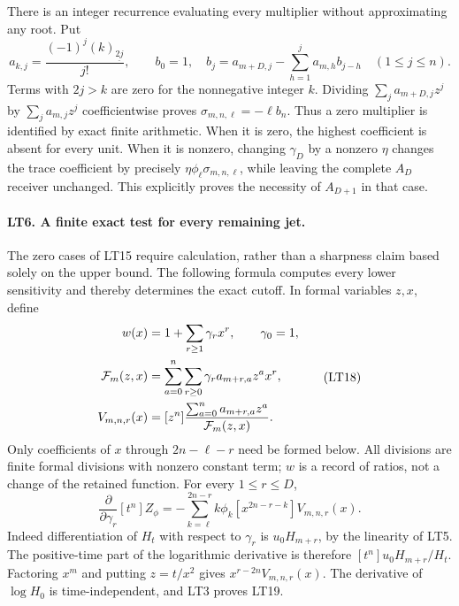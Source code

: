 There is an integer recurrence evaluating every multiplier without
approximating any root. Put
\[
 a_{k,j}=\frac{(-1)^j(k)_{\underline{2j}}}{j!},\qquad
 b_0=1,\quad
 b_j=a_{m+D,j}-\sum_{h=1}^j a_{m,h}b_{j-h}
       \quad(1\le j\le n).
 \tag{LT17}
\]
Terms with $2j>k$ are zero for the nonnegative integer $k$.
Dividing
$\sum_j a_{m+D,j}z^j$ by $\sum_j a_{m,j}z^j$ coefficientwise
proves $\sigma_{m,n,\ell}=-\ell b_n$.
Thus a zero multiplier is identified by exact finite arithmetic.
When it is zero, the highest coefficient is absent for every
unit. When it is nonzero, changing $\gamma_D$ by a nonzero
$\eta$ changes the trace coefficient by precisely
$\eta\phi_\ell\sigma_{m,n,\ell}$, while leaving the complete
$A_D$ receiver unchanged. This explicitly proves the necessity
of $A_{D+1}$ in that case.

\paragraph{LT6. A finite exact test for every remaining jet.}
The zero cases of LT15 require calculation, rather than a sharpness
claim based solely on the upper bound. The following formula computes
every lower sensitivity and thereby determines the exact cutoff.
In formal variables $z,x$, define
\[
 \begin{aligned}
 w(x)&=1+\sum_{r\ge1}\gamma_rx^r,\qquad\gamma_0=1,\\
 {\cal F}_m(z,x)&=
 \sum_{a=0}^{n}\sum_{r\ge0}\gamma_r a_{m+r,a}z^ax^r,
 \\
 V_{m,n,r}(x)&=[z^n]\frac{\sum_{a=0}^{n}a_{m+r,a}z^a}
                                      {{\cal F}_m(z,x)}.
 \end{aligned}
 \tag{LT18}
\]
Only coefficients of $x$ through $2n-\ell-r$ need be formed
below. All divisions are finite formal divisions with nonzero
constant term; $w$ is a record of ratios, not a change of the
retained function.
For every $1\le r\le D$,
\[
 \boxed{\frac{\partial}{\partial\gamma_r}[t^n]Z_\phi
 =-\sum_{k=\ell}^{2n-r} k\phi_k
              [x^{2n-r-k}]V_{m,n,r}(x).}
 \tag{LT19}
\]
Indeed differentiation of $H_t$ with respect to $\gamma_r$
is $u_0H_{m+r}$, by the linearity of LT5. The positive-time
part of the logarithmic derivative is therefore
$[t^n]u_0H_{m+r}/H_t$. Factoring $x^m$ and putting
$z=t/x^2$ gives $x^{r-2n}V_{m,n,r}(x)$. The derivative
of $\log H_0$ is time-independent, and LT3 proves LT19.

